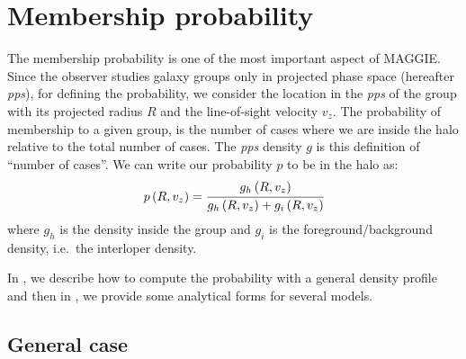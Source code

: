 \section{Membership probability}
\label{sec:probability}

The membership probability is one of the most important aspect of MAGGIE\@.
Since the observer studies galaxy groups only in projected phase space
(hereafter \emph{pps}), for defining the probability, we consider the location
in the \emph{pps} of the group with its projected radius $R$ and the
line-of-sight velocity $v_z$. The probability of membership to a given group,
is the number of cases where we are inside the halo relative to the total
number of cases. The \emph{pps} density $g$ is this definition of ``number of
cases''. We can write our probability $p$ to be in the halo as:
%
\begin{equation}
    \label{eq:probability}
    p \left(R, v_z\right)= \cfrac{g_h \left(R, v_z\right)}
    {g_h \left(R, v_z\right) + g_i \left(R, v_z\right)}
\end{equation}
%
where $g_h$ is the \pps{} density inside the group and $g_i$ is the
foreground/background \pps{} density, i.e.\ the interloper density.

In , we describe how to compute the probability
with a general density profile and then in
, we provide some analytical forms for
several models.

\subsection{General case}
\label{sub:general_case}


